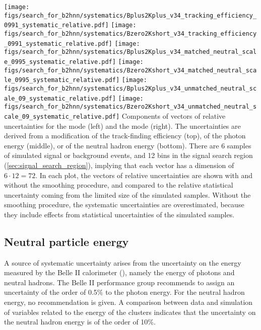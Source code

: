 {
\texttt{[image: figs/search\_for\_b2hnn/systematics/Bplus2Kplus\_v34\_tracking\_efficiency\_0991\_systematic\_relative.pdf]}
\texttt{[image: figs/search\_for\_b2hnn/systematics/Bzero2Kshort\_v34\_tracking\_efficiency\_0991\_systematic\_relative.pdf]}
\texttt{[image: figs/search\_for\_b2hnn/systematics/Bplus2Kplus\_v34\_matched\_neutral\_scale\_0995\_systematic\_relative.pdf]}
\texttt{[image: figs/search\_for\_b2hnn/systematics/Bzero2Kshort\_v34\_matched\_neutral\_scale\_0995\_systematic\_relative.pdf]}
\texttt{[image: figs/search\_for\_b2hnn/systematics/Bplus2Kplus\_v34\_unmatched\_neutral\_scale\_09\_systematic\_relative.pdf]}
\texttt{[image: figs/search\_for\_b2hnn/systematics/Bzero2Kshort\_v34\_unmatched\_neutral\_scale\_09\_systematic\_relative.pdf]}
}
{
Components of vectors of relative uncertainties for the \BKpnn mode (left) and the \BKznn mode (right).
The uncertainties are derived from a modification of the track-finding efficiency (top), of the photon energy (middle), or of the neutral hadron energy (bottom).
There are 6 samples of simulated signal or background events, and 12 bins in the signal search region (\cref{sec:signal_search_region}), implying that each vector has a dimension of $6\cdot12=72$.
In each plot, the vectors of relative uncertainties are shown with and without the smoothing procedure, and compared to the relative statistical uncertainty coming from the limited size of the simulated samples.
Without the smoothing procedure, the systematic uncertainties are overestimated, because they include effects from statistical uncertainties of the simulated samples.
}
\subsection{Neutral particle energy} \label{sec:syst_neutral}
A source of systematic uncertainty arises from the uncertainty on the energy measured by the Belle II calorimeter (\ECL), namely the energy of photons and neutral hadrons.
The Belle II performance group recommends to assign an uncertainty of the order of 0.5\% to the photon energy.
For the neutral hadron energy, no recommendation is given.
A comparison between data and simulation of variables related to the energy of the \ECL clusters indicates that the uncertainty on the neutral hadron energy is of the order of 10\%.

